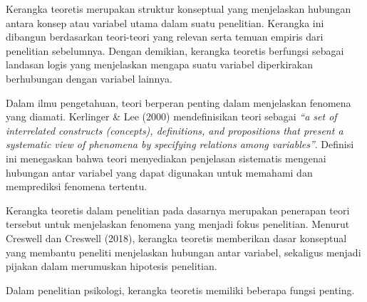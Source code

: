 \documentclass[
  indonesian,
  letterpaper,
  DIV=11,
  numbers=noendperiod]{scrreprt}
\begin{document}
Kerangka teoretis merupakan struktur konseptual yang menjelaskan
hubungan antara konsep atau variabel utama dalam suatu penelitian.
Kerangka ini dibangun berdasarkan teori-teori yang relevan serta temuan
empiris dari penelitian sebelumnya. Dengan demikian, kerangka teoretis
berfungsi sebagai landasan logis yang menjelaskan mengapa suatu variabel
diperkirakan berhubungan dengan variabel lainnya.

Dalam ilmu pengetahuan, teori berperan penting dalam menjelaskan
fenomena yang diamati. Kerlinger \& Lee (2000) mendefinisikan teori
sebagai \emph{``a set of interrelated constructs (concepts),
definitions, and propositions that present a systematic view of
phenomena by specifying relations among variables''}. Definisi ini
menegaskan bahwa teori menyediakan penjelasan sistematis mengenai
hubungan antar variabel yang dapat digunakan untuk memahami dan
memprediksi fenomena tertentu.

Kerangka teoretis dalam penelitian pada dasarnya merupakan penerapan
teori tersebut untuk menjelaskan fenomena yang menjadi fokus penelitian.
Menurut Creswell dan Creswell (2018), kerangka teoretis memberikan dasar
konseptual yang membantu peneliti menjelaskan hubungan antar variabel,
sekaligus menjadi pijakan dalam merumuskan hipotesis penelitian.

Dalam penelitian psikologi, kerangka teoretis memiliki beberapa fungsi
penting.
\end{document}
